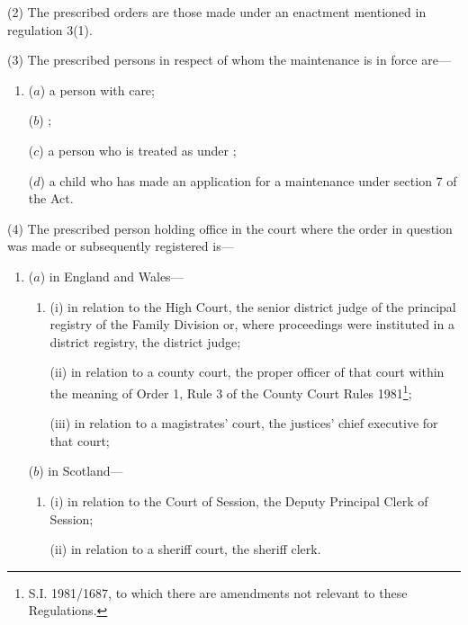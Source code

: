 \documentclass[12pt,a4paper]{article}
\begin{document}
(2) The prescribed orders are those made under an enactment mentioned in regulation 3(1).

(3) The prescribed persons in respect of whom the maintenance  is in force are—
\begin{enumerate}\item[]
($a$) a person with care;

($b$) ;

($c$) a person who is treated as  under 
;  %

($d$) a child who has made an application for a maintenance  under section 7 of the Act.
\end{enumerate}

(4) The prescribed person holding office in the court where the order in question was made or subsequently registered is—
\begin{enumerate}\item[]
($a$) in England and Wales—
\begin{enumerate}\item[]
(i) in relation to the High Court, the senior district judge of the principal registry of the Family Division or, where proceedings were instituted in a district registry, the district judge;

(ii) in relation to a county court, the proper officer of that court within the meaning of Order 1, Rule 3 of the County Court Rules 1981\footnote{\frenchspacing S.I. 1981/1687, to which there are amendments not relevant to these Regulations.};

(iii) in relation to a magistrates' court, the 
justices' chief executive for  %
that court;
\end{enumerate}

($b$) in Scotland—
\begin{enumerate}\item[]
(i) in relation to the Court of Session, the Deputy Principal Clerk of Session;

(ii) in relation to a sheriff court, the sheriff clerk.
\end{enumerate}
\end{enumerate}
\end{document}
